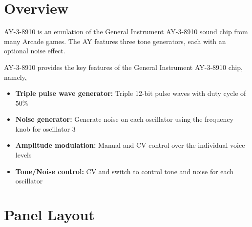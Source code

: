 \documentclass[12pt,letter]{article}
\begin{document}


\section*{Overview}

AY-3-8910 is an emulation of the General Instrument AY-3-8910 sound chip from
many Arcade games. The AY features three tone generators, each with an optional
noise effect.

AY-3-8910 provides the key features of the General Instrument AY-3-8910 chip,
namely,
\begin{itemize}
  \item \textbf{Triple pulse wave generator:} Triple 12-bit pulse waves with duty cycle of $50\%$
  \item \textbf{Noise generator:} Generate noise on each oscillator using the frequency knob for oscillator 3
  \item \textbf{Amplitude modulation:} Manual and CV control over the individual voice levels
  \item \textbf{Tone/Noise control:} CV and switch to control tone and noise for each oscillator
\end{itemize}


\clearpage
\section*{Panel Layout}
\end{document}

